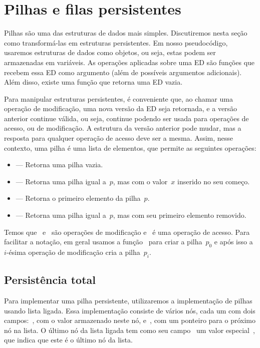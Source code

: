 \documentclass[quali.tex]{subfile}
\begin{document}
\section{Pilhas e filas persistentes}

Pilhas são uma das estruturas de dados mais simples. Discutiremos nesta seção como transformá-las em estruturas persistentes. Em nosso pseudocódigo, usaremos estruturas de dados como objetos, ou seja, estas podem ser armazenadas em variáveis. As operações aplicadas sobre uma ED são funções que recebem essa ED como argumento (além de possíveis argumentos adicionais). Além disso, existe uma função que retorna uma ED vazia.

Para manipular estruturas persistentes, é conveniente que, ao chamar uma operação de modificação, uma nova versão da ED seja retornada, e a versão anterior continue válida, ou seja, continue podendo ser usada para operações de acesso, ou de modificação. A estrutura da versão anterior pode mudar, mas a resposta para qualquer operação de acesso deve ser a mesma. Assim, nesse contexto, uma pilha é uma lista de elementos, que permite as seguintes operações:

\begin{itemize}
	\item {} --- Retorna uma pilha vazia.
	\item {} --- Retorna uma pilha igual a~$p$, mas com o valor~$x$ inserido no seu começo.
	\item {} --- Retorna o primeiro elemento da pilha~$p$.
	\item {} --- Retorna uma pilha igual a~$p$, mas com seu primeiro elemento removido.
\end{itemize}

Temos que~ e~ são operações de modificação e~ é uma operação de acesso. Para facilitar a notação, em geral usamos a função~ para criar a pilha~$p_0$ e após isso a~$i$-ésima operação de modificação cria a pilha~$p_i$.

\subsection{Persistência total}

Para implementar uma pilha persistente, utilizaremos a implementação de pilhas usando lista ligada. Essa implementação consiste de vários nós, cada um com dois campos:~, com o valor armazenado neste nó, e~, com um ponteiro para o próximo nó na lista. O último nó da lista ligada tem como seu campo~ um valor especial~, que indica que este é o último nó da lista.
\end{document}

